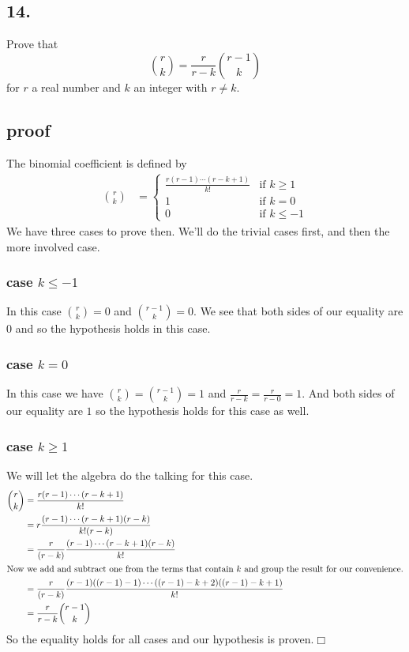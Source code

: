 \documentclass{article}
\begin{document}
\subsection*{14.}
Prove that
\[\binom{r}{k}=\frac{r}{r-k}\binom{r-1}{k}\]
for $r$ a real number and $k$ an integer with $r\ne k$.
\subsection*{proof}
The binomial coefficient is defined by
\begin{align*}
  \binom{r}{k}&=
  \begin{cases}
    \frac{r(r-1)\cdots(r-k+1)}{k!}&\text{if }k\ge 1\\
    1&\text{if }k=0\\
    0&\text{if }k\le-1
  \end{cases}
\end{align*}
We have three cases to prove then. We'll do the trivial cases first, and then the more involved case.
\subsubsection*{case $k\le-1$}
In this case $\binom{r}{k}=0$ and $\binom{r-1}{k}=0$. We see that both sides of our equality are $0$ and so the hypothesis holds in this case.
\subsubsection*{case $k=0$}
In this case we have $\binom{r}{k}=\binom{r-1}{k}=1$ and $\frac{r}{r-k}=\frac{r}{r-0}=1$. And both sides of our equality are $1$ so the hypothesis holds for this case as well.
\subsubsection*{case $k\ge1$}
We will let the algebra do the talking for this case.
\begin{align*}
  \binom{r}{k}&=\frac{r(r-1)\cdots(r-k+1)}{k!}\\
  &=r\frac{(r-1)\cdots(r-k+1)(r-k)}{k!(r-k)}\\
  &=\frac{r}{(r-k)}\frac{(r-1)\cdots(r-k+1)(r-k)}{k!}\\
  \intertext{Now we add and subtract one from the terms that contain $k$ and group the result for our convenience.}
  &=\frac{r}{(r-k)}\frac{(r-1)((r-1)-1)\cdots((r-1)-k+2)((r-1)-k+1)}{k!}\\
  &=\frac{r}{r-k}\binom{r-1}{k}
\end{align*}
So the equality holds for all cases and our hypothesis is proven.$\Box$
\end{document}
